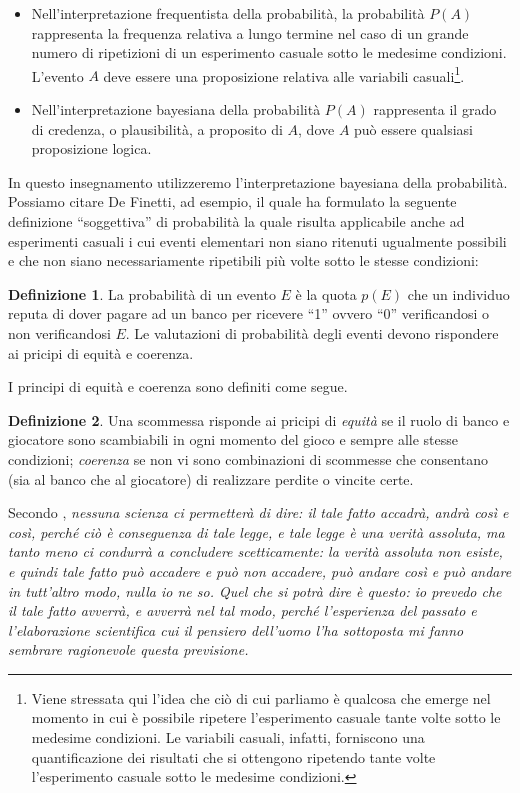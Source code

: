 \documentclass[
  11pt,
]{krantz}
\theoremstyle{definition}
\newtheorem{definition}{Definizione}[chapter]
\theoremstyle{definition}
\theoremstyle{definition}
\theoremstyle{definition}
\theoremstyle{remark}
\begin{document}
\begin{itemize}
\item
  Nell'interpretazione frequentista della probabilità, la probabilità \(P(A)\) rappresenta la frequenza relativa a lungo termine nel caso di un grande numero di ripetizioni di un esperimento casuale sotto le medesime condizioni. L'evento \(A\) deve essere una proposizione relativa alle variabili casuali\footnote{Viene stressata qui l'idea che ciò di cui parliamo è qualcosa che emerge nel momento in cui è possibile ripetere l'esperimento casuale tante volte sotto le medesime condizioni. Le variabili casuali, infatti, forniscono una quantificazione dei risultati che si ottengono ripetendo tante volte l'esperimento casuale sotto le medesime condizioni.}.
\item
  Nell'interpretazione bayesiana della probabilità \(P(A)\) rappresenta il grado di credenza, o plausibilità, a proposito di \(A\), dove \(A\) può essere qualsiasi proposizione logica.
\end{itemize}

In questo insegnamento utilizzeremo l'interpretazione bayesiana della probabilità. Possiamo citare De Finetti, ad esempio, il quale ha formulato la seguente definizione ``soggettiva'' di probabilità la quale risulta applicabile anche ad esperimenti casuali i cui eventi elementari non siano ritenuti ugualmente possibili e che non siano necessariamente ripetibili più volte sotto le stesse condizioni:

\begin{definition}
La probabilità di un evento \(E\) è la quota \(p(E)\) che un individuo reputa di dover pagare ad un banco per ricevere ``1'' ovvero ``0'' verificandosi o non verificandosi \(E\). Le valutazioni di probabilità degli eventi devono rispondere ai pricipi di equità e coerenza.
\end{definition}

I principi di equità e coerenza sono definiti come segue.

\begin{definition}
Una scommessa risponde ai pricipi di \emph{equità} se il ruolo di banco e giocatore sono scambiabili in ogni momento del gioco e sempre alle stesse condizioni; \emph{coerenza} se non vi sono combinazioni di scommesse che consentano (sia al banco che al giocatore) di realizzare perdite o vincite certe.
\end{definition}

Secondo \citet{definetti1931prob}, \emph{nessuna scienza ci permetterà di dire: il tale fatto accadrà, andrà così e così, perché ciò è conseguenza di tale legge, e tale legge è una verità assoluta, ma tanto meno ci condurrà a concludere scetticamente: la verità assoluta non esiste, e quindi tale fatto può accadere e può non accadere, può andare così e può andare in tutt'altro modo, nulla io ne so. Quel che si potrà dire è questo: io prevedo che il tale fatto avverrà, e avverrà nel tal modo, perché l'esperienza del passato e l'elaborazione scientifica cui il pensiero dell'uomo l'ha sottoposta mi fanno sembrare ragionevole questa previsione.}
\end{document}
